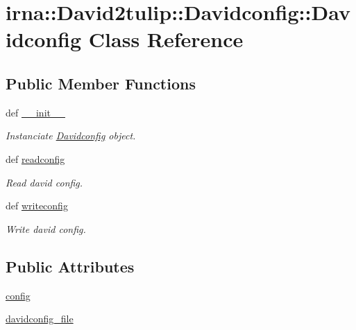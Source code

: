 \hypertarget{classirna_1_1David2tulip_1_1Davidconfig_1_1Davidconfig}{
\section{irna\-:\-:\-David2tulip\-:\-:\-Davidconfig\-:\-:\-Davidconfig \-Class \-Reference}
\label{classirna_1_1David2tulip_1_1Davidconfig_1_1Davidconfig}
}
\subsection*{\-Public \-Member \-Functions}
\begin{DoxyCompactItemize}
\item 
def \hyperlink{classirna_1_1David2tulip_1_1Davidconfig_1_1Davidconfig_a93dfa82ba89270d8573559cbbe45b18a}{\-\_\-\-\_\-init\-\_\-\-\_\-}
\begin{DoxyCompactList}\small\item\em \-Instanciate \hyperlink{classirna_1_1David2tulip_1_1Davidconfig_1_1Davidconfig}{\-Davidconfig} object. \end{DoxyCompactList}\item 
def \hyperlink{classirna_1_1David2tulip_1_1Davidconfig_1_1Davidconfig_af2f15615b2b6870d7489494da8e2ad02}{readconfig}
\begin{DoxyCompactList}\small\item\em \-Read david config. \end{DoxyCompactList}\item 
def \hyperlink{classirna_1_1David2tulip_1_1Davidconfig_1_1Davidconfig_af19c57e9663687e65f8bd17ced08db58}{writeconfig}
\begin{DoxyCompactList}\small\item\em \-Write david config. \end{DoxyCompactList}\end{DoxyCompactItemize}
\subsection*{\-Public \-Attributes}
\begin{DoxyCompactItemize}
\item 
\hyperlink{classirna_1_1David2tulip_1_1Davidconfig_1_1Davidconfig_a62d0e46b666000d50dde2cbc7a60f484}{config}
\item 
\hyperlink{classirna_1_1David2tulip_1_1Davidconfig_1_1Davidconfig_a6a261c69b8063bd4be23e93a7e213c41}{davidconfig\-\_\-file}
\end{DoxyCompactItemize}


